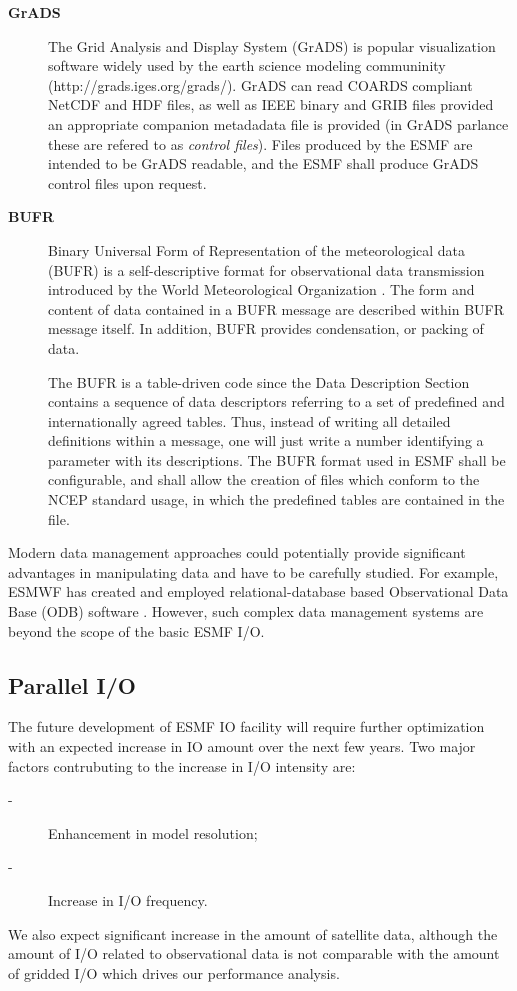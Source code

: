 \begin{description}
\item[\bf GrADS] The Grid Analysis and Display System (GrADS) is popular 
visualization software widely used by the earth science modeling
communinity (http://grads.iges.org/grads/). GrADS can read COARDS
compliant NetCDF and HDF files, as well as IEEE binary and GRIB files
provided an appropriate companion metadadata file is provided (in
GrADS parlance these are refered to as {\em control files}). Files
produced by the ESMF are intended to be GrADS readable, and the ESMF
shall produce GrADS control files upon request.

\item[\bf BUFR] Binary Universal Form of Representation of the meteorological 
data (BUFR) is a self-descriptive format for observational data
transmission introduced by the World Meteorological Organization
\cite{WMO-BUFR-CREX}. The form and content of data contained in a BUFR 
message are described within BUFR message itself. In addition, BUFR provides 
condensation, or packing of data. 

The BUFR is a table-driven code since the Data Description Section
contains a sequence of data descriptors referring to a set of
predefined and internationally agreed tables. Thus, instead of writing
all detailed definitions within a message, one will just write a
number identifying a parameter with its descriptions. The BUFR format
used in ESMF shall be configurable, and shall allow the creation of
files which conform to the NCEP standard usage, in which the
predefined tables are contained in the file.

\end{description}

Modern data management approaches could potentially provide significant 
advantages in manipulating data and have to be carefully studied.
For example, ESMWF has created and employed relational-database based 
Observational Data Base (ODB) software \cite{ODB}.  However, such complex 
data management systems are beyond the scope of the basic ESMF I/O. 


\subsection{Parallel I/O}

The future development of ESMF IO facility will require further
optimization with an expected increase in IO amount over the next few
years. Two major factors contrubuting to the increase in I/O intensity are:
\begin{description}
\item[-] Enhancement in model resolution;
\item[-] Increase in I/O frequency.
\end{description}
We also expect significant increase in the amount of satellite data, although 
the amount of I/O related to observational data is not comparable with 
the amount of gridded I/O which drives our performance analysis. 

